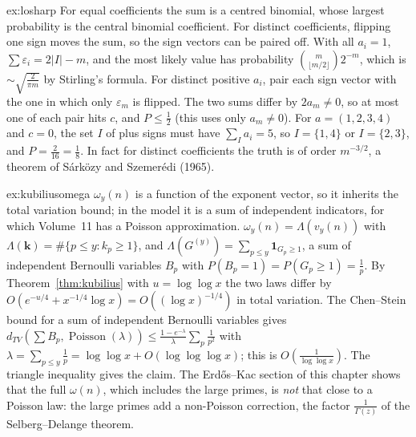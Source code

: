 \begin{solution}{ex:losharp}
\idea For equal coefficients the sum is a centred binomial, whose largest probability is the central binomial coefficient. For distinct coefficients, flipping one sign moves the sum, so the sign vectors can be paired off.
\writeup With all $a_i=1$, $\sum\varepsilon_i=2|I|-m$, and the most likely value has probability $\binom m{\lfloor m/2\rfloor}2^{-m}$, which is $\sim\sqrt{\frac2{\pi m}}$ by Stirling's formula. For distinct positive $a_i$, pair each sign vector with the one in which only $\varepsilon_m$ is flipped. The two sums differ by $2a_m\ne0$, so at most one of each pair hits $c$, and $P\le\frac12$ (this uses only $a_m\ne0$). For $a=(1,2,3,4)$ and $c=0$, the set $I$ of plus signs must have $\sum_{I}a_i=5$, so $I=\{1,4\}$ or $I=\{2,3\}$, and $P=\frac2{16}=\frac18$. In fact for distinct coefficients the truth is of order $m^{-3/2}$, a theorem of S\'ark\"ozy and Szemer\'edi (1965).
\end{solution}

\begin{solution}{ex:kubiliusomega}
\idea $\omega_y(n)$ is a function of the exponent vector, so it inherits the total variation bound; in the model it is a sum of independent indicators, for which Volume~11 has a Poisson approximation.
\writeup $\omega_y(n)=\Lambda(v_y(n))$ with $\Lambda(\mathbf k)=\#\{p\le y:k_p\ge1\}$, and $\Lambda(G^{(y)})=\sum_{p\le y}\mathbf 1_{G_p\ge1}$, a sum of independent Bernoulli variables $B_p$ with $P(B_p=1)=P(G_p\ge1)=\frac1p$. By Theorem~\ref{thm:kubilius} with $u=\log\log x$ the two laws differ by $O(e^{-u/4}+x^{-1/4}\log x)=O((\log x)^{-1/4})$ in total variation. The Chen--Stein bound for a sum of independent Bernoulli variables gives $d_{TV}(\sum B_p,\operatorname{Poisson}(\lambda))\le\frac{1-e^{-\lambda}}\lambda\sum_p\frac1{p^2}$ with $\lambda=\sum_{p\le y}\frac1p=\log\log x+O(\log\log\log x)$; this is $O(\frac1{\log\log x})$. The triangle inequality gives the claim. The Erd\H{o}s--Kac section of this chapter shows that the full $\omega(n)$, which includes the large primes, is \emph{not} that close to a Poisson law: the large primes add a non-Poisson correction, the factor $\frac1{\Gamma(z)}$ of the Selberg--Delange theorem.
\end{solution}

